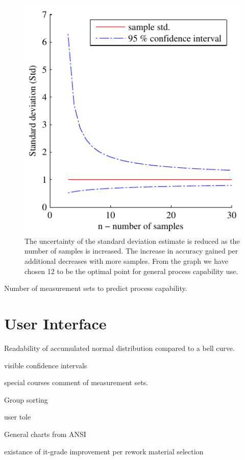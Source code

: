 \documentclass[aip,amsmath, reprint, author-year]{revtex4-1}
\begin{document}
\begin{figure}
\includegraphics{stats_std_confidence.pdf}
\caption{\label{fig:std_uncertainty}The uncertainty of the standard deviation estimate is reduced as the number of samples is increased. The increase in accuracy gained per additional decreases with more samples. From the graph we have chosen 12 to be the optimal point for general process capability use.}
\end{figure}

Number of measurement sets to predict process capability.  


\section{User Interface}

Readability of accumulated normal distribution compared to a bell curve.

visible confidence intervals

special courses comment of measurement sets.

Group sorting 

user tole

General charts from ANSI




existance of it-grade
improvement per rework
material selection
\end{document}
